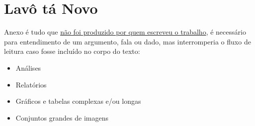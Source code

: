 \chapter{Lavô tá Novo}
Anexo é tudo que \underline{não foi produzido por quem escreveu o trabalho}, é necessário para entendimento de um argumento, fala ou dado, mas interromperia o fluxo de leitura caso fosse incluído no corpo do texto: 

\begin{itemize}
    \item Análises 
    \item Relatórios 
    \item Gráficos e tabelas complexas e/ou longas 
    \item Conjuntos grandes de imagens 
\end{itemize}